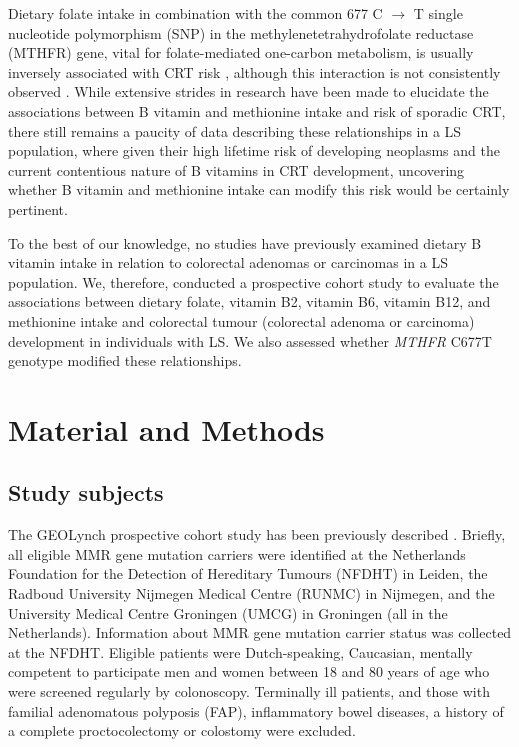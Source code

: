 \noindent Dietary folate intake in combination with the common 677 C $\rightarrow$ T single nucleotide polymorphism (SNP) in the methylenetetrahydrofolate reductase (MTHFR) gene, vital for folate-mediated one-carbon metabolism, is usually inversely associated with CRT risk \cite{c624,c625}, although this interaction is not consistently observed \cite{c621,c626,c627}. While extensive strides in research have been made to elucidate the associations between B vitamin and methionine intake and risk of sporadic CRT, there still remains a paucity of data describing these relationships in a LS population, where given their high lifetime risk of developing neoplasms and the current contentious nature of B vitamins in CRT development, uncovering whether B vitamin and methionine intake can modify this risk would be certainly pertinent.

\noindent To the best of our knowledge, no studies have previously examined dietary B vitamin intake in relation to colorectal adenomas or carcinomas in a LS population. We, therefore, conducted a prospective cohort study to evaluate the associations between dietary folate, vitamin B2, vitamin B6, vitamin B12, and methionine intake and colorectal tumour (colorectal adenoma or carcinoma) development in individuals with LS. We also assessed whether \emph{MTHFR} C677T genotype modified these relationships.

\section[]{Material and Methods} %
\subsection{Study subjects} %
\noindent The GEOLynch prospective cohort study has been previously described \cite{c612}. Briefly, all eligible MMR gene mutation carriers were identified at the Netherlands Foundation for the Detection of Hereditary Tumours (NFDHT) in Leiden, the Radboud University Nijmegen Medical Centre (RUNMC) in Nijmegen, and the University Medical Centre Groningen (UMCG) in Groningen (all in the Netherlands). Information about MMR gene mutation carrier status was collected at the NFDHT. Eligible patients were Dutch-speaking, Caucasian, mentally competent to participate men and women between 18 and 80 years of age who were screened regularly by colonoscopy. Terminally ill patients, and those with familial adenomatous polyposis (FAP), inflammatory bowel diseases, a history of a complete proctocolectomy or colostomy were excluded.


